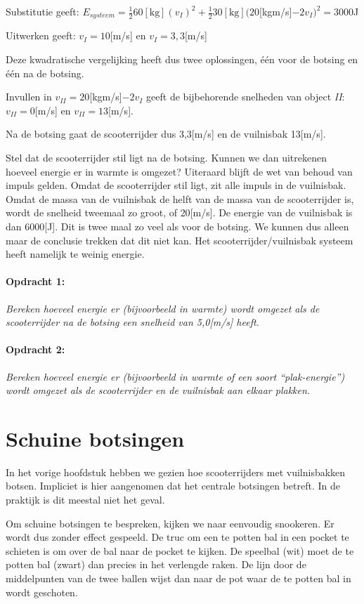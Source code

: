 Substitutie geeft: $E_{systeem}=\frac{1}{2}60\mathrm{[kg]}(v_{I})^{2}+\frac{1}{2}30\mathrm{[kg]}(20${[}kgm/s{]}$-2v_{I})^{2}=3000$J

Uitwerken geeft: $v_{I}=10${[}m/s{]} en $v_{I}=3,3${[}m/s{]}

Deze kwadratische vergelijking heeft dus twee oplossingen, één voor
de botsing en één na de botsing.

Invullen in $v_{II}=20${[}kgm/s{]}$-2v_{I}$ geeft de bijbehorende
snelheden van object \emph{II}: $v_{II}=0${[}m/s{]} en $v_{II}=13${[}m/s{]}.

Na de botsing gaat de scooterrijder dus 3,3{[}m/s{]} en de vuilnisbak
13{[}m/s{]}.

Stel dat de scooterrijder stil ligt na de botsing. Kunnen we dan uitrekenen
hoeveel energie er in warmte is omgezet? Uiteraard blijft de wet van
behoud van impuls gelden. Omdat de scooterrijder stil ligt, zit alle
impuls in de vuilnisbak. Omdat de massa van de vuilnisbak de helft
van de massa van de scooterrijder is, wordt de snelheid tweemaal zo
groot, of 20{[}m/s{]}. De energie van de vuilnisbak is dan 6000{[}J{]}.
Dit is twee maal zo veel als voor de botsing. We kunnen dus alleen
maar de conclusie trekken dat dit niet kan. Het scooterrijder/vuilnisbak
systeem heeft namelijk te weinig energie.

\paragraph*{Opdracht 1:} \emph{Bereken hoeveel energie er (bijvoorbeeld
in warmte) wordt omgezet als de scooterrijder na de bot\-sing een
snelheid van 5,0{[}m/s{]} heeft.}

\paragraph*{Opdracht 2:} \emph{Bereken hoeveel energie er (bijvoorbeeld
in warmte of een soort ``plak-energie'') wordt omgezet als de
scooterrijder en de vuilnisbak aan elkaar plakken.}


\section{Schuine botsingen}

In het vorige hoofdstuk hebben we gezien hoe scooterrijders met vuilnisbakken
botsen. Impliciet is hier aangenomen dat het centrale botsingen betreft.
In de praktijk is dit meestal niet het geval.

Om schuine botsingen te bespreken, kijken we naar eenvoudig snookeren.
Er wordt dus zonder effect gespeeld. De truc om een te potten bal
in een pocket te schieten is om over de bal naar de pocket te kijken.
De speelbal (wit) moet de te potten bal (zwart) dan precies in het
verlengde raken. De lijn door de middelpunten van de twee ballen wijst
dan naar de pot waar de te potten bal in wordt geschoten.


